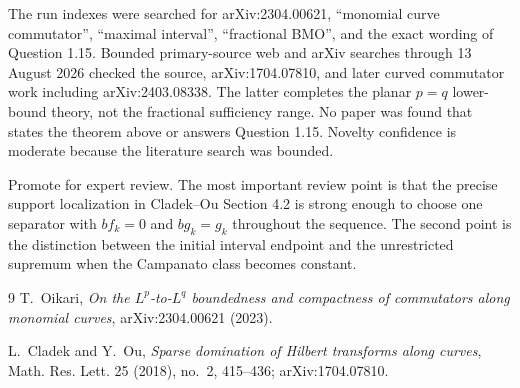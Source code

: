 \documentclass[11pt]{article}
\begin{document}
The run indexes were searched for arXiv:2304.00621, ``monomial curve
commutator'', ``maximal interval'', ``fractional BMO'', and the exact wording
of Question 1.15.  Bounded primary-source web and arXiv searches through
13 August 2026 checked the source, arXiv:1704.07810, and later curved
commutator work including arXiv:2403.08338.  The latter completes the planar
$p=q$ lower-bound theory, not the fractional sufficiency range.  No paper was
found that states the theorem above or answers Question 1.15.  Novelty
confidence is moderate because the literature search was bounded.

Promote for expert review.  The most important review point is that the
precise support localization in Cladek--Ou Section 4.2 is strong enough to
choose one separator with $bf_k=0$ and $bg_k=g_k$ throughout the sequence.
The second point is the distinction between the initial interval endpoint and
the unrestricted supremum when the Campanato class becomes constant.

\begin{thebibliography}{9}
T.~Oikari,
\emph{On the $L^p$-to-$L^q$ boundedness and compactness of commutators along
monomial curves}, arXiv:2304.00621 (2023).

L.~Cladek and Y.~Ou,
\emph{Sparse domination of Hilbert transforms along curves},
Math. Res. Lett. 25 (2018), no.~2, 415--436; arXiv:1704.07810.
\end{thebibliography}
\end{document}
